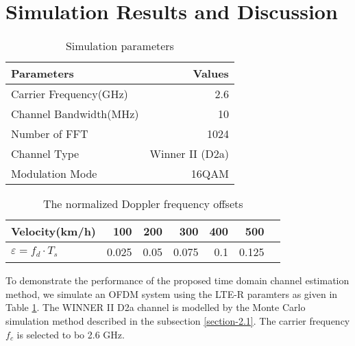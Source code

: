 \documentclass[AMA]{WileyNJD-v1}
\begin{document}
{{{\section{Simulation Results and Discussion}\label{section-4}
	\begin{table}
		\centering
		\caption{Simulation parameters}
		\label{ta:parameters}
					\begin{center}
						\begin{tabular}{|l|r|}
							\hline 	
							Parameters & Values\\
							\hline 
							Carrier Frequency(GHz)  &  2.6   \\
							\hline
							Channel Bandwidth(MHz) & 10\\
							\hline
							Number of FFT & 1024\\
							\hline
							Channel Type & Winner II (D2a)\\
							\hline
							Modulation Mode & 16QAM\\	
							\hline
							
		\end{tabular}
	\end{center}
\end{table}
				
				
\begin{table}
		\centering
		\caption{The normalized Doppler frequency offsets}
		\label{ta:Normalize-frequency-offset}
		\begin{center}
			\begin{tabular}{|l|r|r|r|r|r|r|}
				\hline 	
				Velocity(km/h) & 100 & 200 & 300 & 400 & 500  \\
				\hline 
			{$\varepsilon=f_{d} \cdot T_{s} $} & 0.025 &0.05 & 0.075 & 0.1 & 0.125 \\
				\hline 
			\end{tabular}
		\end{center}
\end{table}
				
To demonstrate the performance of the proposed time domain channel estimation method, we simulate an OFDM system using the LTE-R paramters as given in Table \ref{ta:parameters}. The  WINNER II D2a channel  is modelled by the Monte Carlo simulation method described in the subsection \ref{section-2.1}. The carrier frequency $f_c$ is selected to bo 2.6 GHz.

				
}}}
\end{document}
